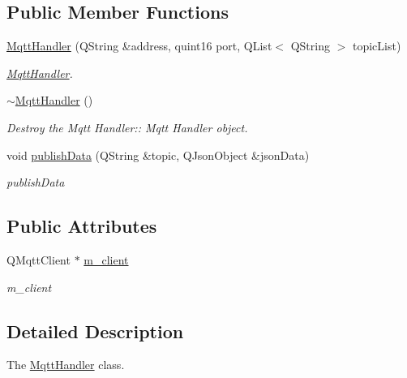 \subsection*{Public Member Functions}
\begin{DoxyCompactItemize}
\item 
\hyperlink{classMqttHandler_a82b5c651c2777c831f186e6a9819bd50}{Mqtt\+Handler} (Q\+String \&address, quint16 port, Q\+List$<$ Q\+String $>$ topic\+List)
\begin{DoxyCompactList}\small\item\em \hyperlink{classMqttHandler}{Mqtt\+Handler}. \end{DoxyCompactList}\item 
\mbox{\label{classMqttHandler_ad7c8c03663ca1139d9ad1954df76375e}} 
\hyperlink{classMqttHandler_ad7c8c03663ca1139d9ad1954df76375e}{$\sim$\+Mqtt\+Handler} ()
\begin{DoxyCompactList}\small\item\em Destroy the Mqtt Handler\+:\+: Mqtt Handler object. \end{DoxyCompactList}\item 
void \hyperlink{classMqttHandler_ac8d16d953468567ff9676e2bb71b9238}{publish\+Data} (Q\+String \&topic, Q\+Json\+Object \&json\+Data)
\begin{DoxyCompactList}\small\item\em publish\+Data \end{DoxyCompactList}\end{DoxyCompactItemize}
\subsection*{Public Attributes}
\begin{DoxyCompactItemize}
\item 
\mbox{\label{classMqttHandler_a8d06cf85d6988c9c9129e170dda38a10}} 
Q\+Mqtt\+Client $\ast$ \hyperlink{classMqttHandler_a8d06cf85d6988c9c9129e170dda38a10}{m\+\_\+client}
\begin{DoxyCompactList}\small\item\em m\+\_\+client \end{DoxyCompactList}\end{DoxyCompactItemize}


\subsection{Detailed Description}
The \hyperlink{classMqttHandler}{Mqtt\+Handler} class. 

